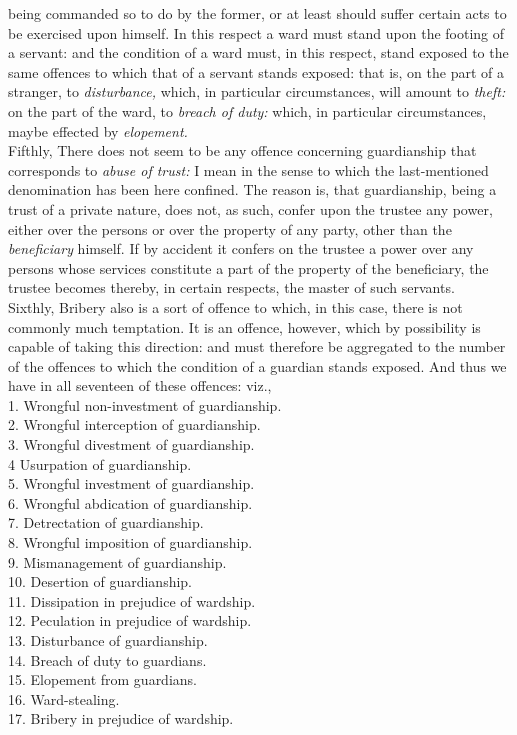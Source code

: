 \documentclass[12pt]{report}
\begin{document}
being commanded so to do by the former, or at least should suffer
certain acts to be exercised upon himself. In this respect a ward must
stand upon the footing of a servant: and the condition of a ward must,
in this respect, stand exposed to the same offences to which that of a
servant stands exposed: that is, on the part of a stranger, to
\emph{disturbance,} which, in particular circumstances, will amount to
\emph{theft:} on the part of the ward, to \emph{breach of duty:} which,
in particular circumstances, maybe effected by \emph{elopement.}\\
Fifthly, There does not seem to be any offence concerning guardianship
that corresponds to \emph{abuse of trust:} I mean in the sense to which
the last-mentioned denomination has been here confined. The reason is,
that guardianship, being a trust of a private nature, does not, as such,
confer upon the trustee any power, either over the persons or over the
property of any party, other than the \emph{beneficiary} himself. If by
accident it confers on the trustee a power over any persons whose
services constitute a part of the property of the beneficiary, the
trustee becomes thereby, in certain respects, the master of such
servants.\\
Sixthly, Bribery also is a sort of offence to which, in this case, there
is not commonly much temptation. It is an offence, however, which by
possibility is capable of taking this direction: and must therefore be
aggregated to the number of the offences to which the condition of a
guardian stands exposed. And thus we have in all seventeen of these
offences: viz.,\\
1. Wrongful non-investment of guardianship.\\
2. Wrongful interception of guardianship.\\
3. Wrongful divestment of guardianship.\\
4 Usurpation of guardianship.\\
5. Wrongful investment of guardianship.\\
6. Wrongful abdication of guardianship.\\
7. Detrectation of guardianship.\\
8. Wrongful imposition of guardianship.\\
9. Mismanagement of guardianship.\\
10. Desertion of guardianship.\\
11. Dissipation in prejudice of wardship.\\
12. Peculation in prejudice of wardship.\\
13. Disturbance of guardianship.\\
14. Breach of duty to guardians.\\
15. Elopement from guardians.\\
16. Ward-stealing.\\
17. Bribery in prejudice of wardship.
\end{document}
